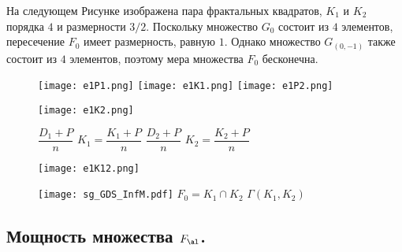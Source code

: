 \begin{example}
На следующем Рисунке изображена пара фрактальных квадратов, $K_1$ и $K_2$ порядка $4$ и размерности $3/2$.
Поскольку множество $G_0$ состоит из $4$ элементов, пересечение $F_0$ имеет размерность, равную $1$.
Однако множество $G_{(0,-1)}$ также состоит из $4$ элементов, поэтому мера множества $F_0$ бесконечна.

\begin{figure}[H]
    \centering
    \texttt{[image: e1P1.png]} 
    \hfill
    \texttt{[image: e1K1.png]} 
    \hfill
    \texttt{[image: e1P2.png]} 
    \hfill
    \begin{minipage}[b][0.22\linewidth][t]{0.22\linewidth}
    \texttt{[image: e1K2.png]} 
    \end{minipage}
    \vfill\vspace{2mm}
    \hspace{1cm} $\dfrac{D_1+P}{n}$ \hfill $K_1=\dfrac{K_1+P}{n}$ \hfill $\dfrac{D_2+P}{n}$ \hfill $K_2=\dfrac{K_2+P}{n}$\hspace{1cm}
    \caption{}
    \label{fig:fs1and2}
\end{figure}

\begin{figure}[H]
    \centering
    \begin{minipage}[b][0.4\linewidth][c]{0.4\linewidth}
    \texttt{[image: e1K12.png]} 
    \end{minipage}
    \hfill
    \texttt{[image: sg\_GDS\_InfM.pdf]} 
    \vfill\vspace{2mm}
    \hspace{2cm} $F_0=K_1\cap K_2$ \hfill $\Gamma(K_1,K_2)$\hspace{3.5cm}
    \caption{}
    \label{fig:fs_int}
\end{figure}

\end{example}


\subsection{Мощность множества $F_\al$.}

